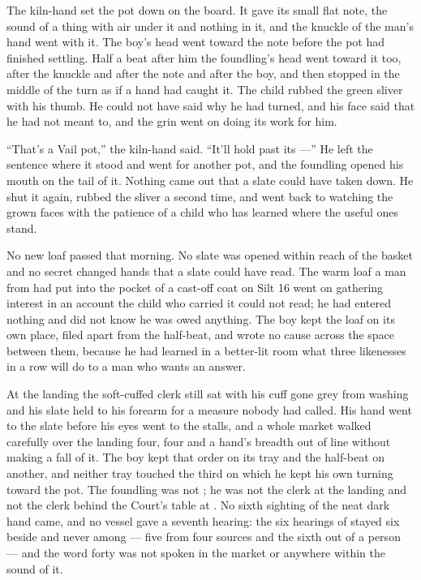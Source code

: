 The kiln-hand set the pot down on the board. It gave its small flat note, the sound of a thing with air under it and nothing in it, and the knuckle of the man's hand went with it. The boy's head went toward the note before the pot had finished settling. Half a beat after him the foundling's head went toward it too, after the knuckle and after the note and after the boy, and then stopped in the middle of the turn as if a hand had caught it. The child rubbed the green sliver with his thumb. He could not have said why he had turned, and his face said that he had not meant to, and the grin went on doing its work for him.

“That's a Vail pot,” the kiln-hand said. “It'll hold past its ---” He left the sentence where it stood and went for another pot, and the foundling opened his mouth on the tail of it. Nothing came out that a slate could have taken down. He shut it again, rubbed the sliver a second time, and went back to watching the grown faces with the patience of a child who has learned where the useful ones stand.

No new loaf passed that morning. No slate was opened within reach of the basket and no secret changed hands that a slate could have read. The warm loaf a man from  had put into the pocket of a cast-off coat on Silt 16 went on gathering interest in an account the child who carried it could not read; he had entered nothing and did not know he was owed anything. The boy kept the loaf on its own place, filed apart from the half-beat, and wrote no cause across the space between them, because he had learned in a better-lit room what three likenesses in a row will do to a man who wants an answer.

At the landing the soft-cuffed clerk still sat with his cuff gone grey from washing and his slate held to his forearm for a measure nobody had called. His hand went to the slate before his eyes went to the stalls, and a whole market walked carefully over the landing four, four and a hand's breadth out of line without making a fall of it. The boy kept that order on its tray and the half-beat on another, and neither tray touched the third on which he kept his own turning toward the pot. The foundling was not ; he was not the clerk at the landing and not the clerk behind the Court's table at . No sixth sighting of the neat dark hand came, and no vessel gave a seventh hearing: the six hearings of  stayed six beside and never among --- five from four sources and the sixth out of a person --- and the word forty was not spoken in the market or anywhere within the sound of it.

